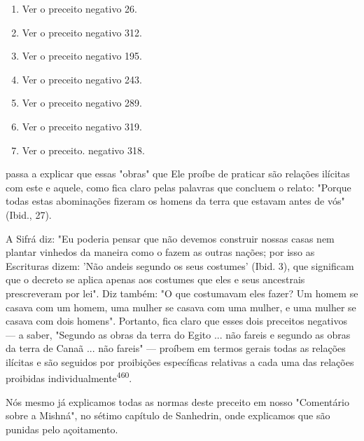 \begin{itemize}
\begin{enumrate}
\begin{itemize}
\begin{itemize}
\begin{itemize}
\begin{enumerate}
\def\labelenumi{\arabic{enumi}.}
\setcounter{enumi}{452}
\item
 
 Ver o preceito negativo 26.
 
\item
 
 Ver o preceito negativo 312.
 
\item
 
 Ver o preceito negativo 195.
 
\item
 
 Ver o preceito negativo 243.
 
\item
 
 Ver o preceito negativo 289.
 
\item
 
 Ver o preceito negativo 319.
 
\item
 
 Ver o preceito. negativo 318.
 
\end{enumerate}



passa a explicar que essas "obras" que Ele proíbe de praticar são
relações ilíci­tas com este e aquele, como fica claro pelas palavras que
concluem o relato: "Porque todas estas abominações fizeram os homens da
terra que estavam an­tes de vós" (Ibid., 27).

A Sifrá diz: "Eu poderia pensar que não devemos construir nossas casas
nem plantar vinhedos da maneira como o fazem as outras nações; por isso
as Escrituras dizem: 'Não andeis segundo os seus costumes' (Ibid. 3),
que significam que o decreto se aplica apenas aos costumes que eles e
seus ances­trais prescreveram por lei". Diz também: "O que costumavam
eles fazer? Um homem se casava com um homem, uma mulher se casava com
uma mulher, e uma mulher se casava com dois homens". Portanto, fica
claro que esses dois preceitos negativos --- a saber, "Segundo as obras
da terra do Egito ... não fa­reis e segundo as obras da terra de Canaã
... não fareis" --- proíbem em termos gerais todas as relações ilícitas
e são seguidos por proibições específicas relati­vas a cada uma das
relações proibidas individualmente\textsuperscript{460}.

Nós mesmo já explicamos todas as normas deste preceito em nosso
"Comentário sobre a Mishná", no sétimo capítulo de Sanhedrin, onde
explica­mos que são punidas pelo açoitamento.


\end{itemize}
\end{itemize}
\end{itemize}
\end{enumrate}
\end{itemize}
